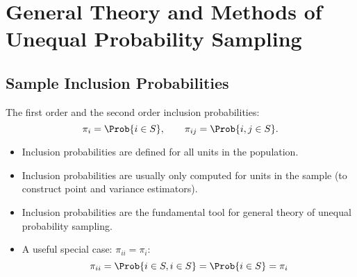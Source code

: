 \chapter{General Theory and Methods of Unequal Probability Sampling}
\section{Sample Inclusion Probabilities}
The first order and the second order inclusion probabilities:
\[ \pi_i=\Prob{i\in S},\qquad \pi_{ij}=\Prob{i,j\in S}. \]
\begin{itemize}
      \item Inclusion probabilities are defined for all units in the population.
      \item Inclusion probabilities are usually only computed for units in the
            sample (to construct point and variance estimators).
      \item Inclusion probabilities are the fundamental tool for general theory of unequal probability sampling.
      \item A useful special case: $ \pi_{ii}=\pi_i $:
            \[ \pi_{ii}=\Prob{i\in S,i\in S}=\Prob{i\in S}=\pi_i \]
\end{itemize}
